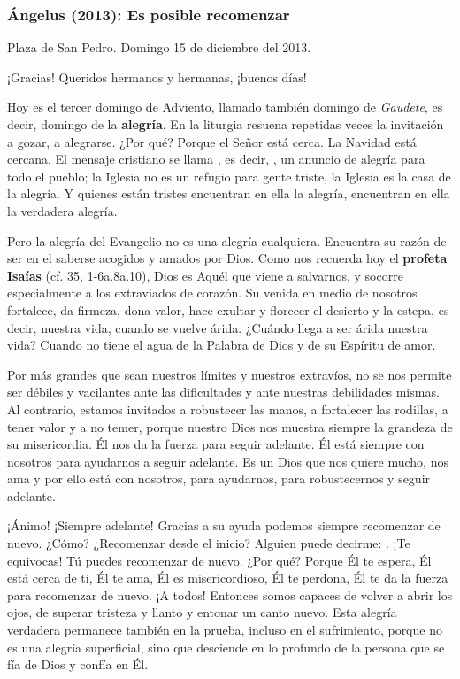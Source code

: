 \begin{body}
\begin{body}
\subsubsection{Ángelus (2013): Es posible recomenzar}

Plaza de San Pedro. Domingo 15 de diciembre del 2013.

¡Gracias! Queridos hermanos y hermanas, ¡buenos días!

Hoy es el tercer domingo de Adviento, llamado también domingo de \emph{Gaudete}, es decir, domingo de la \textbf{alegría}. En la liturgia resuena repetidas veces la invitación a gozar, a alegrarse. ¿Por qué? Porque el Señor está cerca. La Navidad está cercana. El mensaje cristiano se llama , es decir, , un anuncio de alegría para todo el pueblo; la Iglesia no es un refugio para gente triste, la Iglesia es la casa de la alegría. Y quienes están tristes encuentran en ella la alegría, encuentran en ella la verdadera alegría.

Pero la alegría del Evangelio no es una alegría cualquiera. Encuentra su razón de ser en el saberse acogidos y amados por Dios. Como nos recuerda hoy el \textbf{profeta Isaías} (cf. 35, 1-6a.8a.10), Dios es Aquél que viene a salvarnos, y socorre especialmente a los extraviados de corazón. Su venida en medio de nosotros fortalece, da firmeza, dona valor, hace exultar y florecer el desierto y la estepa, es decir, nuestra vida, cuando se vuelve árida. ¿Cuándo llega a ser árida nuestra vida? Cuando no tiene el agua de la Palabra de Dios y de su Espíritu de amor.

Por más grandes que sean nuestros límites y nuestros extravíos, no se nos permite ser débiles y vacilantes ante las dificultades y ante nuestras debilidades mismas. Al contrario, estamos invitados a robustecer las manos, a fortalecer las rodillas, a tener valor y a no temer, porque nuestro Dios nos muestra siempre la grandeza de su misericordia. Él nos da la fuerza para seguir adelante. Él está siempre con nosotros para ayudarnos a seguir adelante. Es un Dios que nos quiere mucho, nos ama y por ello está con nosotros, para ayudarnos, para robustecernos y seguir adelante.

¡Ánimo! ¡Siempre adelante! Gracias a su ayuda podemos siempre recomenzar de nuevo. ¿Cómo? ¿Recomenzar desde el inicio? Alguien puede decirme: . ¡Te equivocas! Tú puedes recomenzar de nuevo. ¿Por qué? Porque Él te espera, Él está cerca de ti, Él te ama, Él es misericordioso, Él te perdona, Él te da la fuerza para recomenzar de nuevo. ¡A todos! Entonces somos capaces de volver a abrir los ojos, de superar tristeza y llanto y entonar un canto nuevo. Esta alegría verdadera permanece también en la prueba, incluso en el sufrimiento, porque no es una alegría superficial, sino que desciende en lo profundo de la persona que se fía de Dios y confía en Él.


\end{body}
\end{body}
